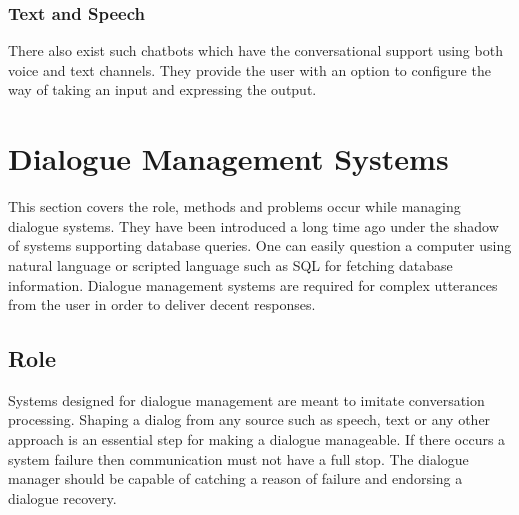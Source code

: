 \subsubsection*{Text and Speech}
There also exist such chatbots which have the conversational support using both voice and text channels. They provide the user with an option to configure the way of taking an input and expressing the output. \cite{frameworkforunderstandingchatbots} 

\section{Dialogue Management Systems}
This section covers the role, methods and problems occur while managing dialogue systems. They have been introduced a long time ago under the shadow of systems supporting database queries. One can easily question a computer using natural language or scripted language such as SQL for fetching database information. Dialogue management systems are required for complex utterances from the user in order to deliver decent responses.

\subsection{Role}
Systems designed for dialogue management are meant to imitate conversation processing. Shaping a dialog from any source such as speech, text or any other approach is an essential step for making a dialogue manageable. If there occurs a system failure then communication must not have a full stop. The dialogue manager should be capable of catching a reason of failure and endorsing a dialogue recovery. \cite{dialoguemanagementsystems}


